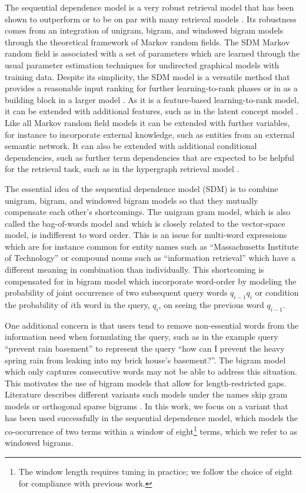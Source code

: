 \documentclass[]{article}
\begin{document}
The sequential dependence model \cite{metzler2005sdm} is a very robust
retrieval model that has been shown to outperform or to be on par
with many retrieval models \cite{huston2013termdependencies}. Its
robustness comes from an integration of unigram, bigram, and windowed
bigram models through the theoretical framework of Markov random fields.
The SDM Markov random field is associated with a set of parameters
which are learned through the usual parameter estimation techniques
for undirected graphical models with training data. Despite its simplicity,
the SDM model is a versatile method that provides a reasonable input
ranking for further learning-to-rank phases or in as a building block
in a larger model \cite{dalton2013kbbridge}. As it is a feature-based
learning-to-rank model, it can be extended with additional features,
such as in the latent concept model \cite{bendersky2011quality,metzler2007lce}.
Like all Markov random field models it can be extended with further
variables, for instance to incorporate external knowledge, such as
entities from an external semantic network. It can also be extended
with additional conditional dependencies, such as further term dependencies
that are expected to be helpful for the retrieval task, such as in
the hypergraph retrieval model \cite{bendersky2012hypergraphs}. 

The essential idea of the sequential dependence model (SDM) is to
combine unigram, bigram, and windowed bigram models so that they mutually
compensate each other's shortcomings. The unigram gram model, which
is also called the bag-of-words model and which is closely related
to the vector-space model, is indifferent to word order. This is an
issue for multi-word expressions which are for instance common for
entity names such as ``Massachusetts Institute of Technology'' or
compound nouns such as ``information retrieval'' which have a different
meaning in combination than individually. This shortcoming is compensated
for in bigram model which incorporate word-order by modeling the probability
of joint occurrence of two subsequent query words $q_{i-1}q_{i}$
or condition the probability of $i$th word in the query, $q_{i}$,
on seeing the previous word $q_{i-1}$. 

One additional concern is that users tend to remove non-essential
words from the information need when formulating the query, such as
in the example query ``prevent rain basement'' to represent the
query ``how can I prevent the heavy spring rain from leaking into
my brick house's basement?''. The bigram model which only captures
consecutive words may not be able to address this situation. This
motivates the use of bigram models that allow for length-restricted
gaps. Literature describes different variants such models under the
names skip gram models or orthogonal sparse bigrams \cite{siefkes2004osb}.
In this work, we focus on a variant that has been used successfully
in the sequential dependence model, which models the co-occurrence
of two terms within a window of eight\footnote{The window length requires tuning in practice; we follow the choice
of eight for compliance with previous work.} terms, which we refer to as windowed bigrams.
\end{document}
